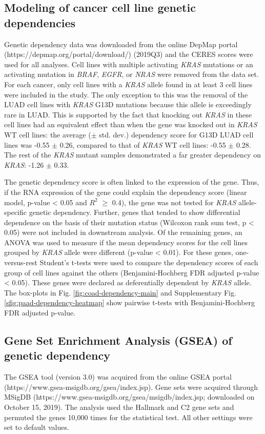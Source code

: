 \documentclass[english, 10pt, letterpaper]{article}
\newcommand{\KRAS}{\emph{KRAS}}
\begin{document}
\subsection*{Modeling of cancer cell line genetic dependencies}
Genetic dependency data was downloaded from the online DepMap portal (https://depmap.org/portal/download/) (2019Q3) and the CERES scores were used for all analyses.
Cell lines with multiple activating \KRAS{} mutations or an activating mutation in \emph{BRAF}, \emph{EGFR}, or \emph{NRAS} were removed from the data set.
For each cancer, only cell lines with a \KRAS{} allele found in at least 3 cell lines were included in the study.
The only exception to this was the removal of the LUAD cell lines with \KRAS{} G13D mutations because this allele is exceedingly rare in LUAD.
This is supported by the fact that knocking out \KRAS{} in these cell lines had an equivalent effect than when the gene was knocked out in \KRAS{} WT cell lines: the average ($\pm$ std. dev.) dependency score for G13D LUAD cell lines was -0.55 $\pm$ 0.26, compared to that of \KRAS{} WT cell lines: -0.55 $\pm$ 0.28. The rest of the \KRAS{} mutant samples demonstrated a far greater dependency on \KRAS{}: -1.26 $\pm$ 0.33.

The genetic dependency score is often linked to the expression of the gene.
Thus, if the RNA expression of the gene could explain the dependency score (linear model, p-value < 0.05 and $R^2$ $\ge$ 0.4), the gene was not tested for \KRAS{} allele-specific genetic dependency.
Further, genes that tended to show differential dependence on the basis of their mutation status (Wilcoxon rank sum test, p < 0.05) were not included in downstream analysis.
Of the remaining genes, an ANOVA was used to measure if the mean dependency scores for the cell lines grouped by \KRAS{} allele were different (p-value < 0.01).
For these genes, one-versus-rest Student's t-tests were used to compare the dependency scores of each group of cell lines against the others (Benjamini-Hochberg FDR adjusted p-value < 0.05).
These genes were declared as deferentially dependent by \KRAS{} allele.
The box-plots in Fig. \ref{fig:coad-dependency-main} and Supplementary Fig. \ref{sfig:paad-dependency-heatmap} show pairwise t-tests with Benjamini-Hochberg FDR adjusted p-value.


\subsection*{Gene Set Enrichment Analysis (GSEA) of genetic dependency}
The GSEA tool (version 3.0) was acquired from the online GSEA portal (https://www.gsea-msigdb.org/gsea/index.jsp).
Gene sets were acquired through MSigDB (https://www.gsea-msigdb.org/gsea/msigdb/index.jsp; downloaded on October 15, 2019).
The analysis used the Hallmark and C2 gene sets and permuted the genes 10,000 times for the statistical test.
All other settings were set to default values.
\end{document}
